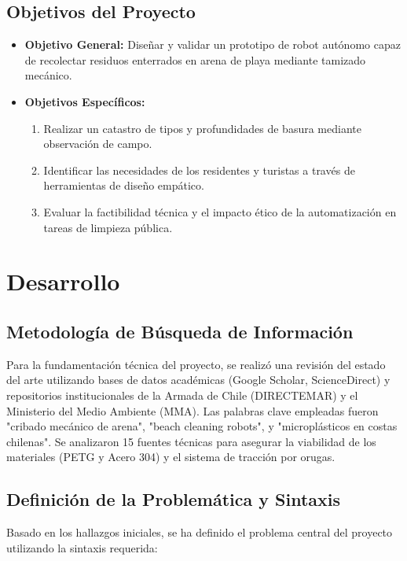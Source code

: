 \subsection{Objetivos del Proyecto}
\begin{itemize}
	\item \textbf{Objetivo General:} Diseñar y validar un prototipo de robot autónomo capaz de recolectar residuos enterrados en arena de playa mediante tamizado mecánico.
	\item \textbf{Objetivos Específicos:}
	      \begin{enumerate}
		      \item Realizar un catastro de tipos y profundidades de basura mediante observación de campo.
		      \item Identificar las necesidades de los residentes y turistas a través de herramientas de diseño empático.
		      \item Evaluar la factibilidad técnica y el impacto ético de la automatización en tareas de limpieza pública.
	      \end{enumerate}
\end{itemize}

\newpage
\section{Desarrollo}

\subsection{Metodología de Búsqueda de Información}
Para la fundamentación técnica del proyecto, se realizó una revisión del estado del arte utilizando bases de datos académicas (Google Scholar, ScienceDirect) y repositorios institucionales de la Armada de Chile (DIRECTEMAR) y el Ministerio del Medio Ambiente (MMA). Las palabras clave empleadas fueron "cribado mecánico de arena", "beach cleaning robots", y "microplásticos en costas chilenas". Se analizaron 15 fuentes técnicas para asegurar la viabilidad de los materiales (PETG y Acero 304) y el sistema de tracción por orugas.

\subsection{Definición de la Problemática y Sintaxis}
Basado en los hallazgos iniciales, se ha definido el problema central del proyecto utilizando la sintaxis requerida:

